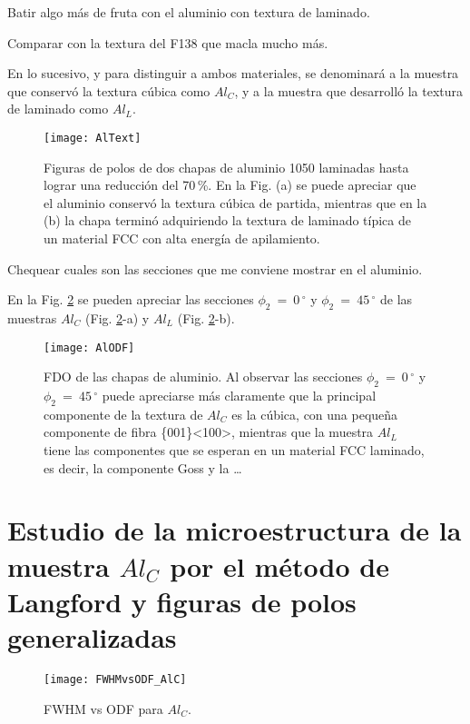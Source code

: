 Batir algo más de fruta con el aluminio con textura de laminado.

Comparar con la textura del F138 que macla mucho más.

En lo sucesivo, y para distinguir a ambos materiales, se denominará a la muestra que conservó la textura cúbica como $Al_C$, y a la muestra que desarrolló la textura de laminado como $Al_L$.

\begin{figure}[!htb]
  \centering
  \texttt{[image: AlText]}
  \caption{Figuras de polos de dos chapas de aluminio 1050 laminadas hasta lograr una reducción del 70\,\%. En la Fig. (a) se puede apreciar que el aluminio conservó la textura cúbica de partida, mientras que en la (b) la chapa terminó adquiriendo la textura de laminado típica de un material FCC con alta energía de apilamiento.}
  \label{fig:AlPDF}
\end{figure}

Chequear cuales son las secciones que me conviene mostrar en el aluminio.

En la Fig. \ref{fig:AlODF} se pueden apreciar las secciones $\phi_2 \ = \ 0$\,$^{\circ}$ y $\phi_2 \ = \ 45$\,$^{\circ}$ de las muestras $Al_C$ (Fig. \ref{fig:AlODF}-a) y $Al_L$ (Fig. \ref{fig:AlODF}-b).

\begin{figure}[!htb]
  \centering
  \texttt{[image: AlODF]}
  \caption{FDO de las chapas de aluminio. Al observar las secciones $\phi_2 \ = \ 0$\,$^{\circ}$ y $\phi_2 \ = \ 45$\,$^{\circ}$ puede apreciarse más claramente que la principal componente de la textura de $Al_C$ es la cúbica, con una pequeña componente de fibra \{001\}\textless 100\textgreater, mientras que la muestra $Al_L$ tiene las componentes que se esperan en un material FCC laminado, es decir, la componente Goss y la \ldots}
  \label{fig:AlODF}
\end{figure}

\section{Estudio de la microestructura de la muestra $Al_C$ por el método de Langford y figuras de polos generalizadas}\label{S:AlCLANG}
\begin{figure}[!htb]
  \centering
  \texttt{[image: FWHMvsODF\_AlC]}
  \caption{FWHM vs ODF para $Al_C$.}
  \label{fig:AlCFWHMODF}
\end{figure}

